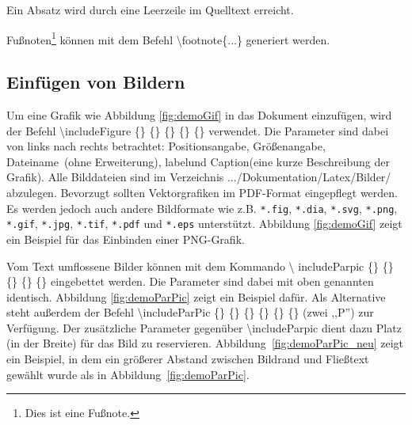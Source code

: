 Ein Absatz wird durch eine Leerzeile im Quelltext erreicht.

Fußnoten\footnote{Dies ist eine Fußnote.} können mit dem Befehl
\textbackslash footnote\{...\} generiert werden.


\subsection{Einfügen von Bildern}


Um eine Grafik wie Abbildung \ref{fig:demoGif} in das Dokument einzufügen, wird
der Befehl \textbackslash includeFigure \{\} \{\} \{\} \{\} \{\} verwendet. Die
Parameter sind dabei von links nach rechts betrachtet: \glqq
Positionsangabe\grqq, \glqq Größenangabe\grqq, \glqq Dateiname\grqq\ (ohne
Erweiter\-ung), \glqq label\grqq und \glqq Caption\grqq (eine kurze Beschreibung
der Grafik). Alle Bilddateien sind im Verzeichnis
.../Dokumentation/Latex/Bilder/ abzulegen. Bevorzugt sollten Vektorgrafiken im
PDF-Format eingepflegt werden. Es werden jedoch auch andere Bildformate wie
z.B. \texttt{*.fig}, \texttt{*.dia}, \texttt{*.svg}, \texttt{*.png},
\texttt{*.gif}, \texttt{*.jpg}, \texttt{*.tif}, \texttt{*.pdf} und
\texttt{*.eps} unterstützt. Abbildung \ref{fig:demoGif} zeigt ein Beispiel für
das Einbinden einer PNG-Grafik.

Vom Text umflossene Bilder können mit dem Kommando \textbackslash
includeParpic \{\} \{\} \{\} \{\} \{\} eingebettet werden. Die
Parameter sind dabei mit oben genannten identisch. Abbildung
\ref{fig:demoParPic} zeigt ein Beispiel dafür.
Als Alternative steht außerdem der Befehl \textbackslash includeParPic
\{\} \{\} \{\} \{\} \{\} \{\}  (zwei ,,P'') zur Verfügung.  Der zusätzliche Parameter
gegenüber \textbackslash includeParpic dient dazu Platz (in der Breite) für das Bild zu reservieren.
Abbildung~\ref{fig:demoParPic_neu} zeigt ein Beispiel, in dem ein größerer Abstand zwischen  Bildrand und Fließtext gewählt wurde als in Abbildung~\ref{fig:demoParPic}.


